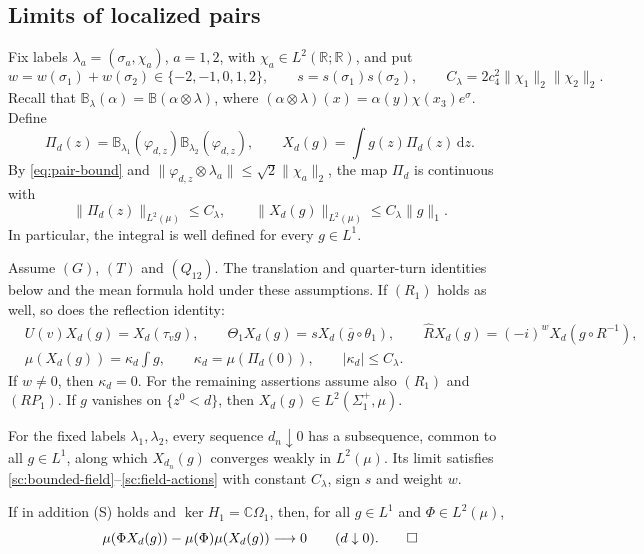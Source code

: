 \documentclass[11pt,letterpaper,reqno]{amsart}
\makeatletter
\theoremstyle{definition}
\newcommand{\ms@minorstart}{%
  \pushQED{\qed}\renewcommand{\qedsymbol}{$\blacksquare$}}
\newenvironment{lemma}[1][]{\ms@minorstart\ms@lemma[#1]}
  {\popQED\endms@lemma}
\theoremstyle{remark}
\makeatother
\begin{document}
\subsection{Limits of localized pairs}

Fix labels $\lambda_a=(\sigma_a,\chi_a)$, $a=1,2$, with
$\chi_a\in L^2(\mathbb R;\mathbb R)$, and put
\[
w=w(\sigma_1)+w(\sigma_2)\in\{-2,-1,0,1,2\},\qquad
s=s(\sigma_1)s(\sigma_2),\qquad
C_\lambda=2c_4^2\|\chi_1\|_2\|\chi_2\|_2.
\]
Recall that $\mathbb B_\lambda(\alpha)=\mathbb B(\alpha\otimes\lambda)$,
where $(\alpha\otimes\lambda)(x)=\alpha(y)\chi(x_3)e^\sigma$.
Define
\begin{equation}\label{sc:pair-field}
\Pi_d(z)=\mathbb B_{\lambda_1}(\varphi_{d,z})
             \mathbb B_{\lambda_2}(\varphi_{d,z}),\qquad
X_d(g)=\int g(z)\Pi_d(z)\,\mathrm dz.
\end{equation}
By \eqref{eq:pair-bound} and
$\|\varphi_{d,z}\otimes\lambda_a\|\le\sqrt2\|\chi_a\|_2$,
the map $\Pi_d$ is continuous with
\begin{equation}\label{sc:pair-field-bound}
\|\Pi_d(z)\|_{L^2(\mu)}\le C_\lambda,\qquad
\|X_d(g)\|_{L^2(\mu)}\le C_\lambda\|g\|_1.
\end{equation}
In particular, the integral is well defined for every $g\in L^1$.

\begin{lemma}[Localized pair fields]\label{sc:pair-limits}
Assume $(G)$, $(T)$ and $(Q_{12})$. The translation and quarter-turn
identities below and the mean formula hold under these assumptions.
If $(R_1)$ holds as well, so does the reflection identity:
\begin{align}
&U(v)X_d(g)=X_d(\tau_vg),\qquad
 \Theta_1X_d(g)=sX_d(\overline g\circ\theta_1),\qquad
 \hat RX_d(g)=(-i)^wX_d(g\circ R^{-1}),
 \label{sc:pair-covariance}\\
&\mu(X_d(g))=\kappa_d\int g,\qquad
 \kappa_d=\mu(\Pi_d(0)),\qquad |\kappa_d|\le C_\lambda.
 \label{sc:pair-mean}
\end{align}
If $w\ne0$, then $\kappa_d=0$.
For the remaining assertions assume also $(R_1)$ and $(RP_1)$.
If $g$ vanishes on $\{z^0<d\}$, then
$X_d(g)\in L^2(\Sigma_1^+,\mu)$.

For the fixed labels $\lambda_1,\lambda_2$, every sequence
$d_n\downarrow0$ has a subsequence, common to all $g\in L^1$, along
which $X_{d_n}(g)$ converges weakly in $L^2(\mu)$.
Its limit satisfies
\eqref{sc:bounded-field}--\eqref{sc:field-actions} with constant
$C_\lambda$, sign $s$ and weight $w$.

If in addition \textup{(S)} holds and
$\ker H_1=\mathbb C\Omega_1$, then, for all
$g\in L^1$ and $\Phi\in L^2(\mu)$,
\begin{equation}\label{sc:pair-factorization}
\mu(\Phi X_d(g))-\mu(\Phi)\mu(X_d(g))\longrightarrow0
\qquad(d\downarrow0).\qedhere
\end{equation}
\end{lemma}
\end{document}
